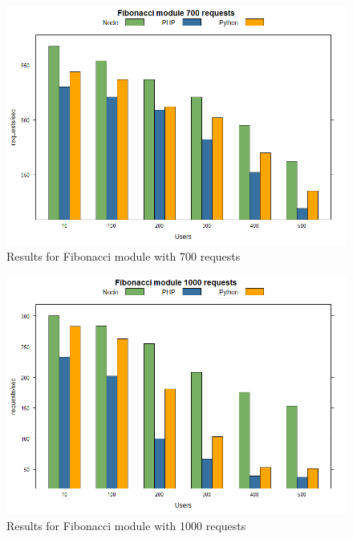 \documentclass[../thesis.tex]{subfiles}
\begin{document}
\begin{figure}[H]
	\centering
	\includegraphics[width=1\textwidth]{../images/700requestsFibo.png}
	\caption{Results for Fibonacci module with 700 requests}
	\label{rys1}
\end{figure}
\begin{figure}[H]
	\centering
	\includegraphics[width=1\textwidth]{../images/1000requestsFibo.png}
	\caption{Results for Fibonacci module with 1000 requests}
	\label{rys1}
\end{figure}
\end{document}
